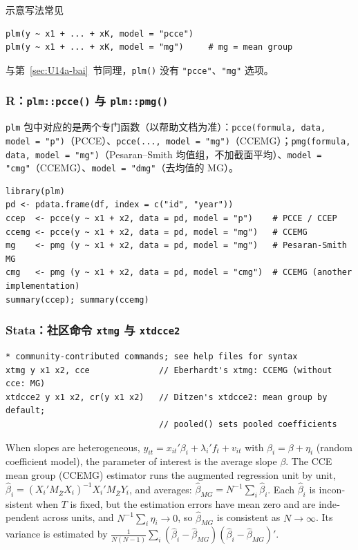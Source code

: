 示意写法常见
\begin{lstlisting}
plm(y ~ x1 + ... + xK, model = "pcce")
plm(y ~ x1 + ... + xK, model = "mg")     # mg = mean group
\end{lstlisting}
与第~\ref{sec:U14a-bai}~节同理，\texttt{plm()} 没有 \texttt{"pcce"}、\texttt{"mg"} 选项。

\subsubsection{R：\texttt{plm::pcce()} 与 \texttt{plm::pmg()}}

\texttt{plm} 包中对应的是两个专门函数（以帮助文档为准）：\texttt{pcce(formula, data, model = "p")}（PCCE）、\texttt{pcce(..., model = "mg")}（CCEMG）；\texttt{pmg(formula, data, model = "mg")}（Pesaran--Smith 均值组，不加截面平均）、\texttt{model = "cmg"}（CCEMG）、\texttt{model = "dmg"}（去均值的 MG）。
\begin{lstlisting}
library(plm)
pd <- pdata.frame(df, index = c("id", "year"))
ccep  <- pcce(y ~ x1 + x2, data = pd, model = "p")    # PCCE / CCEP
ccemg <- pcce(y ~ x1 + x2, data = pd, model = "mg")   # CCEMG
mg    <- pmg (y ~ x1 + x2, data = pd, model = "mg")   # Pesaran-Smith MG
cmg   <- pmg (y ~ x1 + x2, data = pd, model = "cmg")  # CCEMG (another implementation)
summary(ccep); summary(ccemg)
\end{lstlisting}

\subsubsection{Stata：社区命令 \texttt{xtmg} 与 \texttt{xtdcce2}}

\begin{lstlisting}
* community-contributed commands; see help files for syntax
xtmg y x1 x2, cce              // Eberhardt's xtmg: CCEMG (without cce: MG)
xtdcce2 y x1 x2, cr(y x1 x2)   // Ditzen's xtdcce2: mean group by default;
                               // pooled() sets pooled coefficients
\end{lstlisting}

\begin{english}
When slopes are heterogeneous, $y_{it}=x_{it}'\beta_i+\lambda_i'f_t+v_{it}$ with $\beta_i=\beta+\eta_i$ (random coefficient model), the parameter of interest is the average slope $\beta$. The CCE mean group (CCEMG) estimator runs the augmented regression unit by unit, $\hat\beta_i=(X_i'M_{\bar Z}X_i)^{-1}X_i'M_{\bar Z}Y_i$, and averages: $\hat\beta_{MG}=N^{-1}\sum_i\hat\beta_i$. Each $\hat\beta_i$ is inconsistent when $T$ is fixed, but the estimation errors have mean zero and are independent across units, and $N^{-1}\sum_i\eta_i\to0$, so $\hat\beta_{MG}$ is consistent as $N\to\infty$. Its variance is estimated by $\frac{1}{N(N-1)}\sum_i(\hat\beta_i-\hat\beta_{MG})(\hat\beta_i-\hat\beta_{MG})'$.
\end{english}

